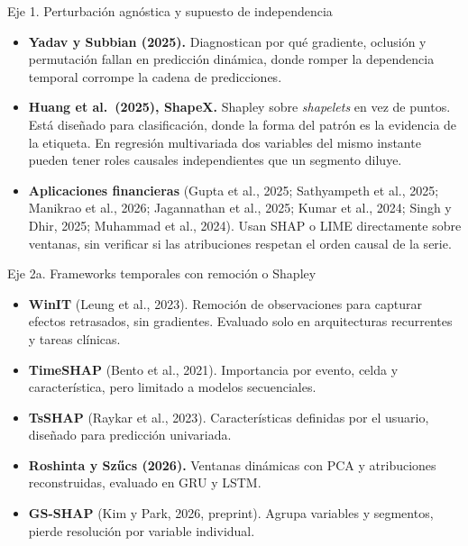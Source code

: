 \documentclass{beamer}
\begin{document}
\begin{frame}{Eje 1. Perturbación agnóstica y supuesto de independencia}
    \small
    \begin{itemize}
        \item \textbf{Yadav y Subbian (2025).} Diagnostican por qué
        gradiente, oclusión y permutación fallan en predicción dinámica,
        donde romper la dependencia temporal corrompe la cadena de
        predicciones.
        \item \textbf{Huang et al.\ (2025), ShapeX.} Shapley sobre
        \emph{shapelets} en vez de puntos. Está diseñado para
        clasificación, donde la forma del patrón es la evidencia de la
        etiqueta. En regresión multivariada dos variables del mismo
        instante pueden tener roles causales independientes que un
        segmento diluye.
        \item \textbf{Aplicaciones financieras} (Gupta et al., 2025;
        Sathyampeth et al., 2025; Manikrao et al., 2026; Jagannathan et
        al., 2025; Kumar et al., 2024; Singh y Dhir, 2025; Muhammad et al.,
        2024). Usan SHAP o LIME directamente sobre ventanas, sin verificar
        si las atribuciones respetan el orden causal de la serie.
    \end{itemize}
\end{frame}

\begin{frame}{Eje 2a. Frameworks temporales con remoción o Shapley}
    \footnotesize
    \begin{itemize}
        \item \textbf{WinIT} (Leung et al., 2023). Remoción de
        observaciones para capturar efectos retrasados, sin gradientes.
        Evaluado solo en arquitecturas recurrentes y tareas clínicas.
        \vspace{0.1cm}
        \item \textbf{TimeSHAP} (Bento et al., 2021). Importancia por
        evento, celda y característica, pero limitado a modelos
        secuenciales.
        \vspace{0.1cm}
        \item \textbf{TsSHAP} (Raykar et al., 2023). Características
        definidas por el usuario, diseñado para predicción univariada.
        \vspace{0.1cm}
        \item \textbf{Roshinta y Szűcs (2026).} Ventanas dinámicas con
        PCA y atribuciones reconstruidas, evaluado en GRU y LSTM.
        \vspace{0.1cm}
        \item \textbf{GS-SHAP} (Kim y Park, 2026, preprint). Agrupa
        variables y segmentos, pierde resolución por variable individual.
    \end{itemize}
\end{frame}
\end{document}
